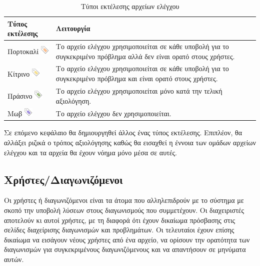 \documentclass[diploma]{softlab-thesis}
\begin{document}
  \begin{table}
    \begin{tabular}{ | l | p{10cm} |}
    \hline
    Τύπος εκτέλεσης & Λειτουργία \\ \hline
    Πορτοκαλί \includegraphics[scale=0.8]{Figures/tag_orange.png} &
      Το αρχείο ελέγχου χρησιμοποιείται σε κάθε υποβολή για το συγκεκριμένο πρόβλημα
      αλλά δεν είναι ορατό στους χρήστες. \\ \hline
    Κίτρινο \includegraphics[scale=0.8]{Figures/tag_yellow.png} &
      Το αρχείο ελέγχου χρησιμοποιείται σε κάθε υποβολή για το συγκεκριμένο πρόβλημα
      και είναι ορατό στους χρήστες. \\ \hline
    Πράσινο \includegraphics[scale=0.8]{Figures/tag_green.png} &
      Το αρχείο ελέγχου χρησιμοποιείται μόνο κατά την τελική αξιολόγηση. \\ \hline
    Μωβ \includegraphics[scale=0.8]{Figures/tag_purple.png} &
      Το αρχείο ελέγχου δεν χρησιμοποιείται. \\ \hline
    \end{tabular}
  \caption{Τύποι εκτέλεσης αρχείων ελέγχου}
  \end{table}

\bigskip

Σε επόμενο κεφάλαιο θα δημιουργηθεί άλλος ένας τύπος εκτέλεσης. Επιπλέον, θα
αλλάξει ριζικά ο τρόπος αξιολόγησης καθώς θα εισαχθεί η έννοια των ομάδων
αρχείων ελέγχου και τα αρχεία θα έχουν νόημα μόνο μέσα σε αυτές.

\subsection{Χρήστες/Διαγωνιζόμενοι}

Οι χρήστες ή διαγωνιζόμενοι είναι τα άτομα που αλληλεπιδρούν με το σύστημα με
σκοπό την υποβολή λύσεων στους διαγωνισμούς που συμμετέχουν. Οι διαχειριστές
αποτελούν κι αυτοί χρήστες, με τη διαφορά ότι έχουν δικαίωμα πρόσβασης στις
σελίδες διαχείρισης διαγωνισμών και προβλημάτων. Οι τελευταίοι έχουν επίσης
δικαίωμα να εισάγουν νέους χρήστες από ένα αρχείο, να ορίσουν την ορατότητα των
διαγωνισμών για συγκεκριμένους διαγωνιζόμενους και να απαντήσουν σε μηνύματα
αυτών.
\end{document}
